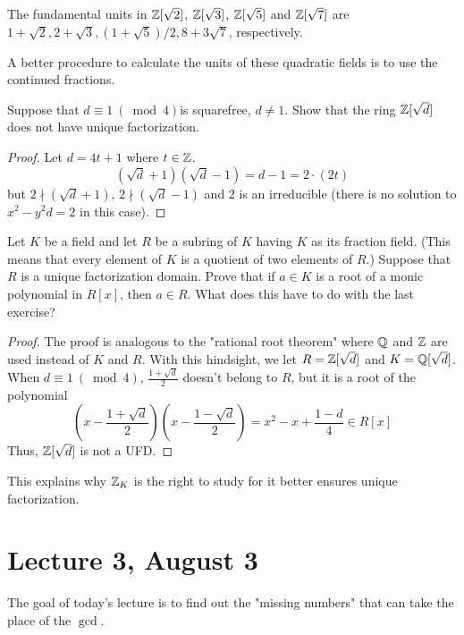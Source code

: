 \documentclass[12pt,twoside=semi,openright,numbers=noenddot]{scrbook}
\begin{document}
    \begin{example}
        The fundamental units in $\mathbb Z[\sqrt{2}]$, $\mathbb Z[\sqrt{3}]$, $\mathbb Z[\sqrt{5}]$ and $\mathbb Z[\sqrt{7}]$ are 
        $1+\sqrt{2}, 2+\sqrt{3}, (1+\sqrt{5})/2, 8+3\sqrt{7}$, respectively.
    \end{example}
    \begin{remark}
        A better procedure to calculate the units of these quadratic fields is to use the continued fractions.
    \end{remark}
\begin{problem}
    Suppose that $d \equiv 1 \ (\bmod 4) $is squarefree, $d \neq 1$. Show that the ring $\mathbb Z[\sqrt{d}]$ does not have
    unique factorization.
\end{problem}
    \begin{proof}
        Let $d = 4t+1$ where $t \in \mathbb Z$.
        $$(\sqrt{d}+1)(\sqrt{d}-1) = d - 1 = 2 \cdot (2t)$$
        but $ 2 \nmid (\sqrt{d}+1)$, $2 \nmid (\sqrt{d}-1)$ and $2$ is an irreducible (there is no solution to $x^2-y^2d = 2$ in this case).
    \end{proof}

\begin{problem}
    Let $K$ be a field and let $R$ be a subring of $K$ having $K$ as its fraction field. 
    (This means that every element of $K$ is a quotient of two elements of $R$.) 
    Suppose that $R$ is a unique factorization domain. Prove that if $a \in K$ is a root of a monic polynomial in $R[x]$,
    then $a \in R$. What does this have to do with the last exercise?
\end{problem}
    \begin{proof}
        The proof is analogous to the "rational root theorem" where $\mathbb Q$ and $\mathbb Z$ are used instead of $K$ and $R$.
        With this hindsight, we let $R = \mathbb Z[\sqrt{d}]$ and $K = \mathbb Q[\sqrt{d}]$. 
        When $d \equiv 1 \ (\bmod 4)$, $\frac{1+\sqrt{d}}{2}$ doesn't belong to $R$, but it is a root of 
        the polynomial 
        $$ \left(x-\frac{1+\sqrt{d}}{2}\right)\left(x-\frac{1-\sqrt{d}}{2}\right) = x^2-x+\frac{1-d}{4} \in R[x] $$
        Thus, $\mathbb Z[\sqrt{d}]$ is not a UFD.
    \end{proof}
    \begin{remark}
        This explains why $\mathbb Z_K$ is the right to study for it better ensures unique factorization.
    \end{remark}

\section{Lecture 3, August 3}
The goal of today's lecture is to find out the "missing numbers" that can take the place of the $\gcd$.
\end{document}
